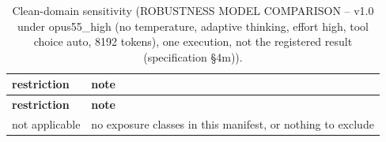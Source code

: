 \begingroup\footnotesize
\begin{longtable}{>{\raggedright\arraybackslash}p{126.4pt}>{\raggedright\arraybackslash}p{304.6pt}}
\caption{Clean-domain sensitivity (ROBUSTNESS MODEL COMPARISON -- v1.0 under opus55\_\allowbreak{}high (no temperature, adaptive thinking, effort high, tool choice auto, 8192 tokens), one execution, not the registered result (specification §4m)).} \\
\toprule
\textbf{restriction} & \textbf{note} \\
\midrule
\endfirsthead
\toprule
\textbf{restriction} & \textbf{note} \\
\midrule
\endhead
\bottomrule
\endfoot
not applicable & no exposure classes in this manifest, or nothing to exclude \\
\end{longtable}
\endgroup
